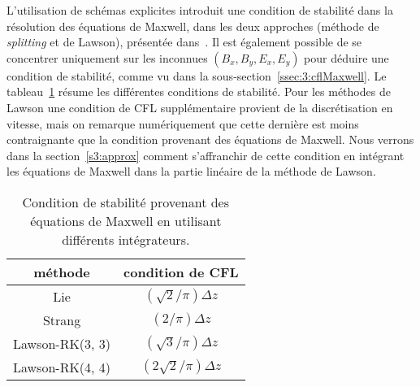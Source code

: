 L'utilisation de schémas explicites introduit une condition de stabilité dans la résolution des équations de Maxwell, dans les deux approches (méthode de \emph{splitting} et de Lawson), présentée dans~\cite{Kormann:2021}. Il est également possible de se concentrer uniquement sur les inconnues $(B_x,B_y,E_x,E_y)$ pour déduire une condition de stabilité, comme vu dans la sous-section~\ref{ssec:3:cflMaxwell}. Le tableau~\ref{tab:CFL_maxwell} résume les différentes conditions de stabilité. Pour les méthodes de Lawson une condition de CFL supplémentaire provient de la discrétisation en vitesse, mais on remarque numériquement que cette dernière est moins contraignante que la condition provenant des équations de Maxwell. Nous verrons dans la section~\ref{s3:approx} comment s'affranchir de cette condition en intégrant les équations de Maxwell dans la partie linéaire de la méthode de Lawson.

\begin{table}[h]
  \centering
  \begin{tabular}{c|c}
    méthode         & condition de CFL          \\
    \hline
    Lie             & $(\sqrt{2}/\pi) \Delta z$ \\ 
    Strang          & $(2/\pi)\Delta z$         \\
    Lawson-RK(3, 3) & $(\sqrt{3}/\pi)\Delta z$  \\ 
    Lawson-RK(4, 4) & $(2\sqrt{2}/\pi) \Delta z$  
  \end{tabular}
  \caption{Condition de stabilité provenant des équations de Maxwell en utilisant différents intégrateurs.} 
  \label{tab:CFL_maxwell}
\end{table}

